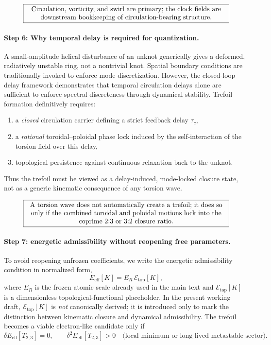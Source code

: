 \documentclass[11pt,a4paper]{article}
\newcommand{\boxedstatement}[1]{\fbox{\parbox{0.86\linewidth}{\centering #1}}}
\begin{document}
\begin{equation}
\boxedstatement{Circulation, vorticity, and swirl are primary; the clock fields are downstream bookkeeping of circulation-bearing structure.}
\label{eq:boxedCirculationBeforeClock}
\end{equation}

\paragraph{Step 6: Why temporal delay is required for quantization.}
A small-amplitude helical disturbance of an unknot generically gives a deformed, radiatively unstable ring, not a nontrivial knot. Spatial boundary conditions are traditionally invoked to enforce mode discretization. However, the closed-loop delay framework demonstrates that temporal circulation delays alone are sufficient to enforce spectral discreteness through dynamical stability. Trefoil formation definitively requires:
\begin{enumerate}
    \item a \emph{closed} circulation carrier defining a strict feedback delay $\tau_c$,
    \item a \emph{rational} toroidal--poloidal phase lock induced by the self-interaction of the torsion field over this delay,
    \item topological persistence against continuous relaxation back to the unknot.
\end{enumerate}
Thus the trefoil must be viewed as a delay-induced, mode-locked closure state, not as a generic kinematic consequence of any torsion wave.

\begin{equation}
\boxedstatement{A torsion wave does not automatically create a trefoil; it does so only if the combined toroidal and poloidal motions lock into the coprime $2{:}3$ or $3{:}2$ closure ratio.}
\label{eq:boxedTrefoilNotAutomatic}
\end{equation}

\paragraph{Step 7: energetic admissibility without reopening free parameters.}
To avoid reopening unfrozen coefficients, we write the energetic admissibility condition in normalized form,
\begin{equation}
E_{\mathrm{eff}}[K]
=
E_R\,\mathcal E_{\mathrm{top}}[K],
\label{eq:EeffTopNormalized}
\end{equation}
where \(E_R\) is the frozen atomic scale already used in the main text and \(\mathcal E_{\mathrm{top}}[K]\) is a dimensionless topological-functional placeholder. In the present working draft, \(\mathcal E_{\mathrm{top}}[K]\) is \emph{not} canonically derived; it is introduced only to mark the distinction between kinematic closure and dynamical admissibility. The trefoil becomes a viable electron-like candidate only if
\begin{equation}
\delta E_{\mathrm{eff}}[T_{2,3}] = 0,
\qquad
\delta^2 E_{\mathrm{eff}}[T_{2,3}] > 0
\quad\text{(local minimum or long-lived metastable sector).}
\label{eq:trefoilstabilityTrefoil}
\end{equation}
\end{document}
